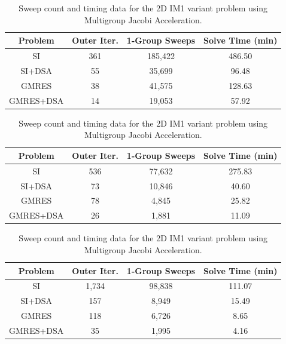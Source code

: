 \documentclass[preprint,10pt]{elsarticle}
\begin{document}
\begin{table}
\caption{Sweep count and timing data for the 2D IM1 variant problem using Two-Grid Acceleration.}
\centering
\def\arraystretch{1.25}
\begin{tabular}{|c|c|c|c|}
\hline
Problem & Outer Iter.  & 1-Group Sweeps & Solve Time (min)  \\
\hline \hline
{SI} & {361}  &{185,422}  &  {486.50} \\ \hline
SI+DSA & 55 & 35,699 &  96.48 \\ \hline
GMRES & 38  & 41,575 &  128.63 \\ \hline
GMRES+DSA & 14  & 19,053  & 57.92  \\ \hline
\end{tabular}
\label{tab::IM1_2D_TG}
\vspace{1.5cm}
\caption{Sweep count and timing data for the 2D IM1 variant problem using Modified Two-Grid Acceleration.}
\centering
\def\arraystretch{1.25}
\begin{tabular}{|c|c|c|c|}
\hline
Problem & Outer Iter.  & 1-Group Sweeps & Solve Time (min)  \\
\hline \hline
{SI} & {536}  & {77,632} & {275.83}  \\ \hline
SI+DSA & 73  & 10,846 &  40.60 \\ \hline
GMRES & 78  & 4,845 &  25.82 \\ \hline
GMRES+DSA & 26  & 1,881 & 11.09  \\ \hline
\end{tabular}
\label{tab::IM1_2D_MTG}
\vspace{1.5cm}
\caption{Sweep count and timing data for the 2D IM1 variant problem using Multigroup Jacobi Acceleration.}
\centering
\def\arraystretch{1.25}
\begin{tabular}{|c|c|c|c|}
\hline
Problem & Outer Iter.  & 1-Group Sweeps & Solve Time (min)  \\
\hline \hline
{SI}  & {1,734} & {98,838} &  {111.07} \\ \hline
SI+DSA  & 157 & 8,949 &  15.49 \\ \hline
GMRES  & 118 & 6,726 &  8.65 \\ \hline
{GMRES+DSA} &   {35} & {1,995} &  {4.16} \\ \hline
\end{tabular}
\label{tab::IM1_2D_MJA}
\end{table}
\end{document}
